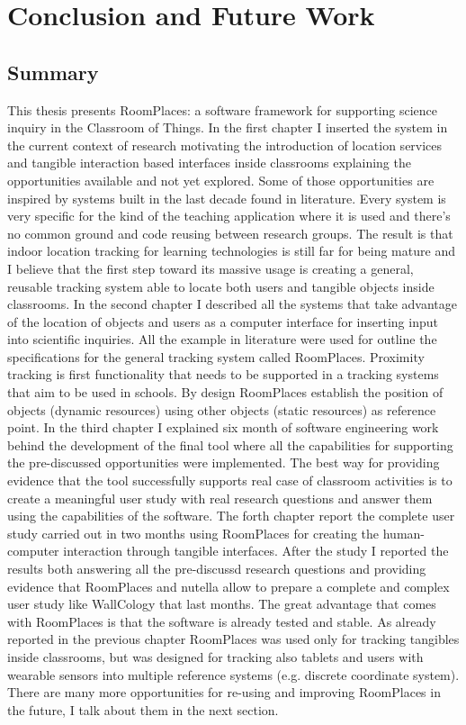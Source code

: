 \chapter{Conclusion and Future Work}

\label {ch:conclusions}

\section{Summary}
This thesis presents RoomPlaces: a software framework for supporting science inquiry in the Classroom of Things. In the first chapter I inserted the system in the current context of research motivating the introduction of location services and tangible interaction based interfaces inside classrooms explaining the opportunities available and not yet explored. Some of those opportunities are inspired by systems built in the last decade found in literature. Every system is very specific for the kind of the teaching application where it is used and there's no common ground and code reusing between research groups. The result is that indoor location tracking for learning technologies is still far for being mature and I believe that the first step toward its massive usage is creating a general, reusable tracking system able to locate both users and tangible objects inside classrooms. In the second chapter I described all the systems that take advantage of the location of objects and users as a computer interface for inserting input into scientific inquiries. All the example in literature were used for outline the specifications for the general tracking system called RoomPlaces. Proximity tracking is first functionality that needs to be supported in a tracking systems that aim to be used in schools. By design RoomPlaces establish the position of objects (dynamic resources) using other objects (static resources) as reference point. In the third chapter I explained six month of software engineering work behind the development of the final tool where all the capabilities for supporting the pre-discussed opportunities were implemented. The best way for providing evidence that the tool successfully supports real case of classroom activities is to create a meaningful user study with real research questions and answer them using the capabilities of the software. The forth chapter report the complete user study carried out in two months using RoomPlaces for creating the human-computer interaction through tangible interfaces. After the study I reported the results both answering all the pre-discussd research questions and providing evidence that RoomPlaces and nutella allow to prepare a complete and complex user study like WallCology that last months. The great advantage that comes with RoomPlaces is that the software is already tested and stable. As already reported in the previous chapter RoomPlaces was used only for tracking tangibles inside classrooms, but was designed for tracking also tablets and users with wearable sensors into multiple reference systems (e.g. discrete coordinate system). There are many more opportunities for re-using and improving RoomPlaces in the future, I talk about them in the next section.

